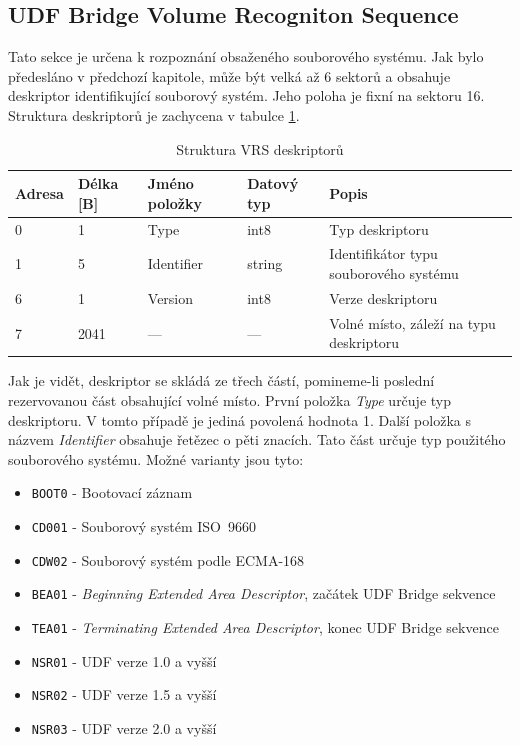 \subsection{UDF Bridge Volume Recogniton Sequence}
\label{sec:vrs}
Tato sekce je určena k rozpoznání obsaženého souborového systému. Jak bylo předesláno v předchozí kapitole, může být velká až 6 sektorů  a obsahuje deskriptor identifikující souborový systém. Jeho poloha je fixní na sektoru 16. \\
Struktura deskriptorů je zachycena v tabulce \ref{tab:vrs}.
\begin{table}
    \begin{tabular}{ | l | l | l | l | l | }
        \hline
        Adresa  & Délka [B]   & Jméno položky & Datový typ    & Popis \\ \hline
        0       & 1             & Type           & int8          & Typ deskriptoru \\ \hline
        1       & 5             & Identifier & string        & Identifikátor typu souborového systému \\ \hline
        6       & 1             & Version         & int8          & Verze deskriptoru \\ \hline
        7       & 2041          & ---           & ---           & Volné místo, záleží na typu deskriptoru \\ \hline
    \end{tabular}
    \caption{Struktura VRS deskriptorů\label{tab:vrs}}
\end{table}
Jak je vidět, deskriptor se skládá ze třech částí, pomineme-li poslední rezervovanou část obsahující volné místo. První položka \textit{Type} určuje typ deskriptoru. V tomto případě je jediná povolená hodnota 1. Další položka s názvem \textit{Identifier} obsahuje řetězec o pěti znacích. Tato část určuje typ použitého souborového systému. Možné varianty jsou tyto:
\begin{itemize}
    \item \texttt{BOOT0} - Bootovací záznam
    \item \texttt{CD001} - Souborový systém ISO~9660
    \item \texttt{CDW02} - Souborový systém podle ECMA-168 \cite{ecma-168}
    \item \texttt{BEA01} - \textit{Beginning Extended Area Descriptor}, začátek UDF Bridge sekvence
    \item \texttt{TEA01} - \textit{Terminating Extended Area Descriptor}, konec UDF Bridge sekvence
    \item \texttt{NSR01} - UDF verze 1.0 a vyšší
    \item \texttt{NSR02} - UDF verze 1.5 a vyšší
    \item \texttt{NSR03} - UDF verze 2.0 a vyšší
\end{itemize}
